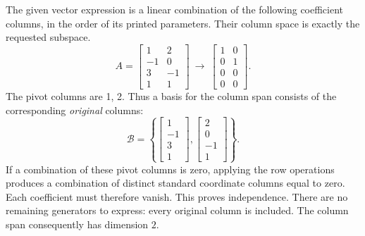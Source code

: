 The given vector expression is a linear combination of the following coefficient columns, in the order of its printed parameters. Their column space is exactly the requested subspace.
\[A=\left[\begin{array}{rr}1&2\\-1&0\\3&-1\\1&1\end{array}\right]\ \longrightarrow\ \left[\begin{array}{rr}1&0\\0&1\\0&0\\0&0\end{array}\right].\]
The pivot columns are 1, 2. Thus a basis for the column span consists of the corresponding \emph{original} columns:
\[\mathcal B=\left\{\left[\begin{array}{r}1\\-1\\3\\1\end{array}\right],\left[\begin{array}{r}2\\0\\-1\\1\end{array}\right]\right\}.\]
If a combination of these pivot columns is zero, applying the row operations produces a combination of distinct standard coordinate columns equal to zero. Each coefficient must therefore vanish. This proves independence. There are no remaining generators to express: every original column is included. The column span consequently has dimension $2$.

